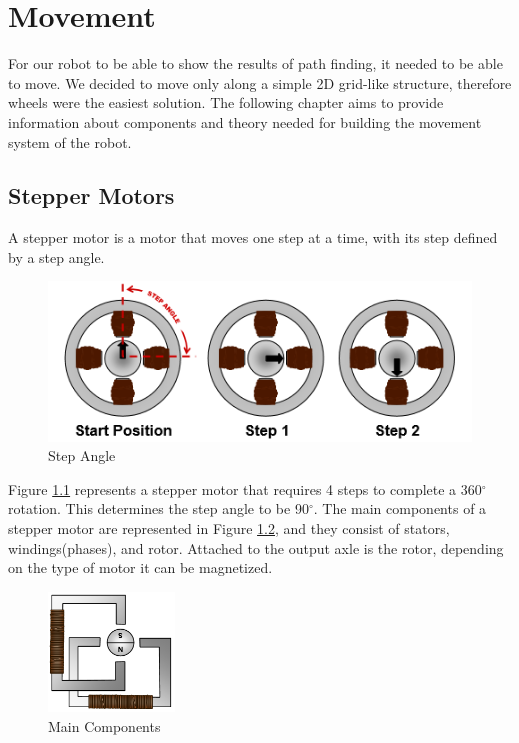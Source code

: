\chapter{Movement}\label{ch:move}
For our robot to be able to show the results of path finding,
it needed to be able to move. We decided to move only along a simple 2D grid-like structure,
therefore wheels were the easiest solution. The following chapter aims to provide information about
components and theory needed for building the movement system of the robot.



\section{Stepper Motors}\label{sec:motors}
A stepper motor is a motor that moves one step at a time, with its step defined by a step angle.

\begin{figure}[ht]
	\centering
	\includegraphics[width=\textwidth]{figures/move/motor1.png}
	\caption{Step Angle}
	\label{fig:angle} 
\end{figure}

Figure \ref{fig:angle} represents a stepper motor that requires 4 steps to complete a 360$^\circ$ 
rotation. This determines the step angle to be 90$^\circ$.
\newpage
The main components of a stepper motor are represented in Figure \ref{fig:main_components}, and 
they consist of stators, windings(phases), and rotor.
Attached to the output axle is the rotor, depending on the type of motor it can be magnetized.

\begin{figure}[htp]
	\centering
	\includegraphics[width=0.3\textwidth]{figures/move/motor2.png}
	\caption{Main Components}
	\label{fig:main_components}
\end{figure}


